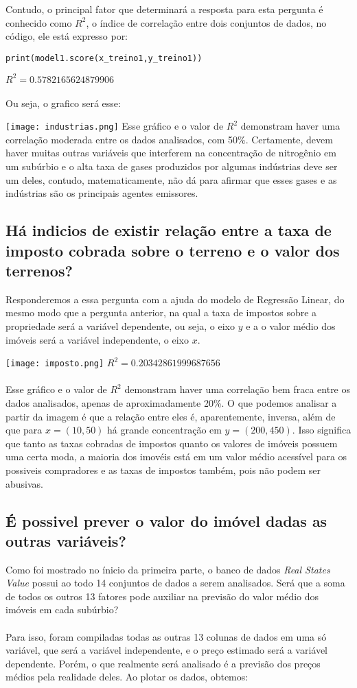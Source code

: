 \documentclass[12pt]{article}
\begin{document}
Contudo, o principal fator que determinará a resposta para esta pergunta é conhecido como $R^2$, o índice de correlação entre dois conjuntos de dados, no código, ele está expresso por:
\begin{lstlisting}
print(model1.score(x_treino1,y_treino1))
\end{lstlisting}
$R^2 = 0.5782165624879906$
\\
\\
Ou seja, o grafico será esse:

\texttt{[image: industrias.png]}
Esse gráfico e o valor de $R^2$ demonstram haver uma correlação moderada entre os dados analisados, com 50\%. Certamente, devem haver muitas outras variáveis que interferem na concentração de nitrogênio em um subúrbio e o alta taxa de gases produzidos por algumas indústrias deve ser um deles, contudo, matematicamente, não dá para afirmar que esses gases e as indústrias são os principais agentes emissores.

\subsection{Há indicios de existir relação entre a taxa de imposto cobrada sobre o terreno e o valor dos terrenos?}
Responderemos a essa pergunta com a ajuda do modelo de Regressão Linear, do mesmo modo que a pergunta anterior, na qual a taxa de impostos sobre a propriedade será a variável dependente, ou seja, o eixo $y$ e a o valor médio dos imóveis será a variável independente, o eixo $x$. 


\texttt{[image: imposto.png]}
 $R^2 = 0.20342861999687656$
 \\
 \\
 
Esse gráfico e o valor de $R^2$ demonstram haver uma correlação bem fraca entre os dados analisados, apenas de aproximadamente 20\%. O que podemos analisar a partir da imagem é que a relação entre eles é, aparentemente, inversa, além de que para $x = (10, 50)$ há grande concentração em $y= (200, 450)$. Isso significa que tanto as taxas cobradas de impostos quanto os valores de imóveis possuem uma certa moda, a maioria dos imovéis está em um valor médio acessível para os possiveis compradores e as taxas de impostos também, pois não podem ser abusivas.

\subsection{É possivel prever o valor do imóvel dadas as outras variáveis?}
Como foi mostrado no ínicio da primeira parte, o banco de dados \emph{Real States Value} possui ao todo 14 conjuntos de dados a serem analisados. Será que a soma de todos os outros 13 fatores pode auxiliar na previsão do valor médio dos imóveis em cada subúrbio?
\\
\\
Para isso, foram compiladas todas as outras 13 colunas de dados em uma só variável, que será a variável independente, e o preço estimado será a variável dependente. Porém, o que realmente será analisado é a previsão dos preços médios pela realidade deles. Ao plotar os dados, obtemos:
\end{document}
